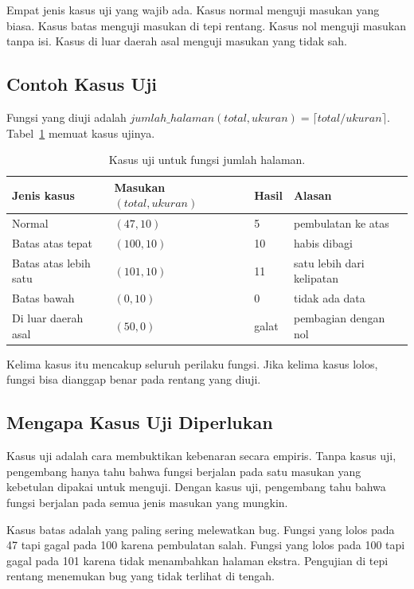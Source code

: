 \documentclass[11pt,a4paper]{article}
\begin{document}
Empat jenis kasus uji yang wajib ada. Kasus normal menguji masukan yang biasa. Kasus batas menguji masukan di tepi rentang. Kasus nol menguji masukan tanpa isi. Kasus di luar daerah asal menguji masukan yang tidak sah.

\subsection{Contoh Kasus Uji}

Fungsi yang diuji adalah $jumlah\_halaman(total, ukuran)=\lceil total/ukuran \rceil$. Tabel~\ref{tab:kasus-uji} memuat kasus ujinya.

\begin{table}[H]
	\centering
	\caption{Kasus uji untuk fungsi jumlah halaman.}
	\label{tab:kasus-uji}
	\small
	\begin{tabularx}{\textwidth}{l X l X}
		\toprule
		Jenis kasus           & Masukan $(total, ukuran)$ & Hasil & Alasan                    \\
		\midrule
		Normal                & $(47, 10)$                & 5     & pembulatan ke atas        \\
		Batas atas tepat      & $(100, 10)$               & 10    & habis dibagi              \\
		Batas atas lebih satu & $(101, 10)$               & 11    & satu lebih dari kelipatan \\
		Batas bawah           & $(0, 10)$                 & 0     & tidak ada data            \\
		Di luar daerah asal   & $(50, 0)$                 & galat & pembagian dengan nol      \\
		\bottomrule
	\end{tabularx}
\end{table}

Kelima kasus itu mencakup seluruh perilaku fungsi. Jika kelima kasus lolos, fungsi bisa dianggap benar pada rentang yang diuji.

\subsection{Mengapa Kasus Uji Diperlukan}

Kasus uji adalah cara membuktikan kebenaran secara empiris. Tanpa kasus uji, pengembang hanya tahu bahwa fungsi berjalan pada satu masukan yang kebetulan dipakai untuk menguji. Dengan kasus uji, pengembang tahu bahwa fungsi berjalan pada semua jenis masukan yang mungkin.

Kasus batas adalah yang paling sering melewatkan bug. Fungsi yang lolos pada 47 tapi gagal pada 100 karena pembulatan salah. Fungsi yang lolos pada 100 tapi gagal pada 101 karena tidak menambahkan halaman ekstra. Pengujian di tepi rentang menemukan bug yang tidak terlihat di tengah.
\end{document}
